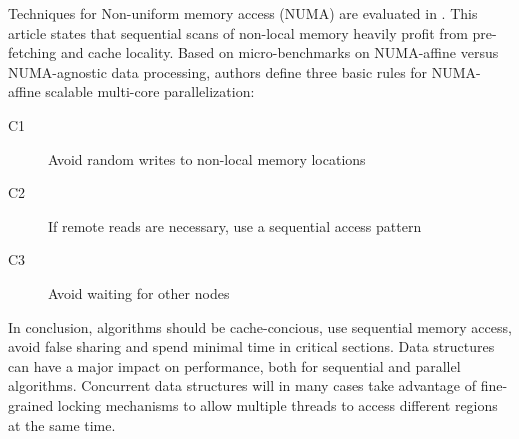 Techniques for Non-uniform memory access (NUMA) are evaluated in
\cite{sortmergejoin}. This article states that sequential scans of
non-local memory heavily profit from pre-fetching and cache locality.
Based on micro-benchmarks on NUMA-affine versus NUMA-agnostic data
processing, authors define three basic rules for NUMA-affine scalable
multi-core parallelization:

\begin{description}
	\item[C1] Avoid random writes to non-local memory locations
	\item[C2] If remote reads are necessary, use a sequential access pattern
	\item[C3] Avoid waiting for other nodes
\end{description}

In conclusion, algorithms should be cache-concious, use sequential
memory access, avoid false sharing and spend minimal time in critical
sections. Data structures can have a major impact on performance, both
for sequential and parallel algorithms. Concurrent data structures
will in many cases take advantage of fine-grained locking
mechanisms to allow multiple threads to access different regions
at the same time. 
